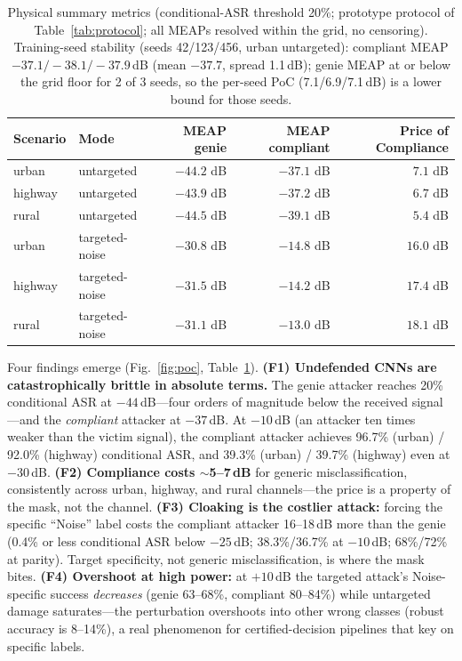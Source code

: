 \documentclass[review]{elsarticle}
\begin{document}
\begin{table}[t]
\centering
\caption{Physical summary metrics (conditional-ASR threshold 20\%;
prototype protocol of Table~\ref{tab:protocol}; all MEAPs resolved within
the grid, no censoring). Training-seed stability (seeds 42/123/456, urban
untargeted): compliant MEAP $-37.1/-38.1/-37.9$\,dB (mean $-37.7$, spread
1.1\,dB); genie MEAP at or below the grid floor for 2 of 3 seeds, so the
per-seed PoC (7.1/6.9/7.1\,dB) is a lower bound for those seeds.}
\label{tab:metrics}
\begin{tabular}{llrrr}
\toprule
Scenario & Mode & MEAP genie & MEAP compliant & Price of Compliance \\
\midrule
urban & untargeted & $-44.2$ dB & $-37.1$ dB & $7.1$ dB \\
highway & untargeted & $-43.9$ dB & $-37.2$ dB & $6.7$ dB \\
rural & untargeted & $-44.5$ dB & $-39.1$ dB & $5.4$ dB \\
urban & targeted-noise & $-30.8$ dB & $-14.8$ dB & $16.0$ dB \\
highway & targeted-noise & $-31.5$ dB & $-14.2$ dB & $17.4$ dB \\
rural & targeted-noise & $-31.1$ dB & $-13.0$ dB & $18.1$ dB \\
\bottomrule
\end{tabular}
\end{table}

Four findings emerge (Fig.~\ref{fig:poc}, Table~\ref{tab:metrics}).
\textbf{(F1) Undefended CNNs are catastrophically
brittle in absolute terms.} The genie attacker reaches 20\% conditional ASR
at $-44$\,dB---four orders of magnitude below the received signal---and the
\emph{compliant} attacker at $-37$\,dB. At $-10$\,dB (an attacker ten times
weaker than the victim signal), the compliant attacker achieves 96.7\%
(urban) / 92.0\% (highway) conditional ASR, and 39.3\% (urban) /
39.7\% (highway) even at $-30$\,dB. \textbf{(F2) Compliance costs
${\sim}$5--7\,dB} for generic misclassification, consistently across urban,
highway, and rural channels---the price is a property of the mask, not the
channel. \textbf{(F3) Cloaking is the costlier attack:} forcing the specific
``Noise'' label costs the compliant attacker 16--18\,dB more than the genie
(0.4\% or less conditional ASR below $-25$\,dB; 38.3\%/36.7\% at
$-10$\,dB; 68\%/72\% at parity).
Target specificity, not generic misclassification, is where the mask bites.
\textbf{(F4) Overshoot at high power:} at $+10$\,dB the targeted attack's
Noise-specific success \emph{decreases} (genie 63--68\%, compliant
80--84\%) while untargeted damage saturates---the perturbation overshoots
into other wrong classes (robust accuracy is 8--14\%), a real phenomenon for certified-decision pipelines
that key on specific labels.
\end{document}
